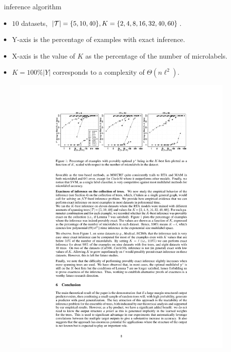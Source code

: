 \documentclass[first=dgreen,second=purple,logo=yellowexc]{aaltoslides}
\begin{document}
%
\begin{frame}{\rta\ inference algorithm}
	\begin{itemize}\footnotesize
		\item $10$ datasets, $|\mathcal{T}| = \{5,10,40\}, K=\{2,4,8,16,32,40,60\}$.
		\item Y-axis is the percentage of examples with exact inference.
		\item X-axis is the value of $K$ as the percentage of the number of microlabels.
		\item $K=100\%|Y|$ corresponds to a complexity of $\Theta(n\ell^2)$.
	\end{itemize}
	\begin{figure}
		\begin{center}
			\includegraphics[width=11cm]{./result_plot.pdf}
		\end{center}
	\end{figure}
\end{frame}
\end{document}
